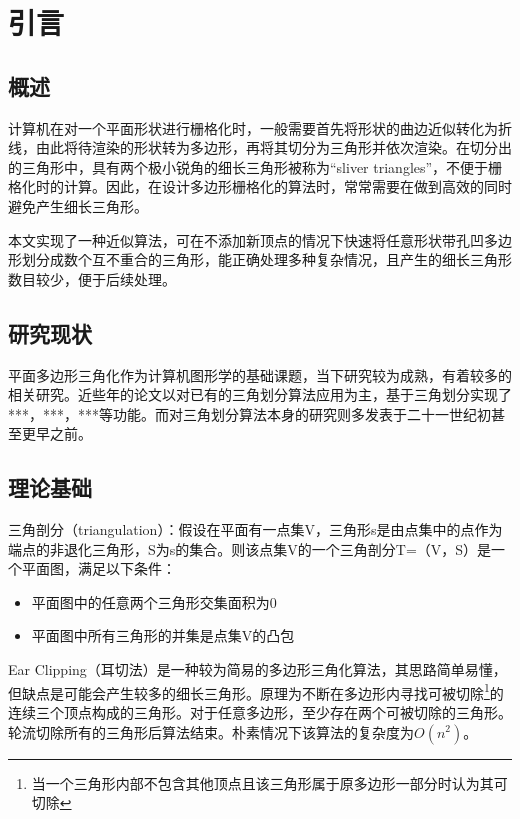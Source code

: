 
\chapter{引言}

\section{概述}
  计算机在对一个平面形状进行栅格化时，一般需要首先将形状的曲边近似转化为折线，由此将待渲染的形状转为多边形，再将其切分为三角形并依次渲染。在切分出的三角形中，具有两个极小锐角的细长三角形被称为“sliver triangles”，不便于栅格化时的计算。因此，在设计多边形栅格化的算法时，常常需要在做到高效的同时避免产生细长三角形。

  本文实现了一种近似算法，可在不添加新顶点的情况下快速将任意形状带孔凹多边形划分成数个互不重合的三角形，能正确处理多种复杂情况，且产生的细长三角形数目较少，便于后续处理。
\section{研究现状}

平面多边形三角化作为计算机图形学的基础课题，当下研究较为成熟，有着较多的相关研究。近些年的论文以对已有的三角划分算法应用为主，基于三角划分实现了***，***，***等功能。而对三角划分算法本身的研究则多发表于二十一世纪初甚至更早之前。

\section{理论基础}
三角剖分（triangulation）：假设在平面有一点集V，三角形s是由点集中的点作为端点的非退化三角形，S为s的集合。则该点集V的一个三角剖分T=（V，S）是一个平面图，满足以下条件：
\begin{itemize}
  \item 平面图中的任意两个三角形交集面积为0
  \item 平面图中所有三角形的并集是点集V的凸包
\end{itemize}

Ear Clipping（耳切法）是一种较为简易的多边形三角化算法，其思路简单易懂，但缺点是可能会产生较多的细长三角形。原理为不断在多边形内寻找可被切除\footnote[1]{当一个三角形内部不包含其他顶点且该三角形属于原多边形一部分时认为其可切除}的连续三个顶点构成的三角形。对于任意多边形，至少存在两个可被切除的三角形。轮流切除所有的三角形后算法结束。朴素情况下该算法的复杂度为\(O(n^2)\)。

